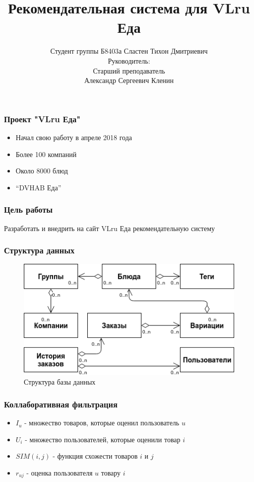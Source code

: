 \documentclass[10pt, unicode]{beamer}
\title{Рекомендательная система для VLru Еда}
\author[Сластен Т.Д.]{Студент группы Б8403а Сластен Тихон Дмитриевич\\
Руководитель:\\
Старший преподаватель\\
Александр Сергеевич Кленин}
\date{}
\begin{document}
\begin{frame}
  \titlepage
  \thispagestyle{empty}
\end{frame}

\begin{frame}
  \frametitle{Проект "VLru Еда"}
  \begin{itemize}
    \item Начал свою работу в апреле 2018 года
    \item Более 100 компаний
    \item Около 8000 блюд
    \item ``DVHAB Еда''
  \end{itemize}
\end{frame}

\begin{frame}
  \frametitle{Цель работы}
  Разработать и внедрить на сайт VLru Еда рекомендательную систему
\end{frame}

\begin{frame}
  \frametitle{Структура данных}
  \begin{figure}[H]
    \centering
    \includegraphics[scale=0.6]{images/database.png}
    \caption{Структура базы данных}
  \end{figure}
\end{frame}

\begin{frame}
  \frametitle{Коллаборативная фильтрация}
  \begin{itemize}
    \item $I_u$ - множество товаров, которые оценил пользователь $u$
    \item $U_i$ - множество пользователей, которые оценили товар $i$
    \item $SIM(i,j)$ - функция схожести товаров $i$ и $j$
    \item $r_{uj}$ - оценка пользователя $u$ товару $i$
  \end{itemize}
\end{frame}
\end{document}
